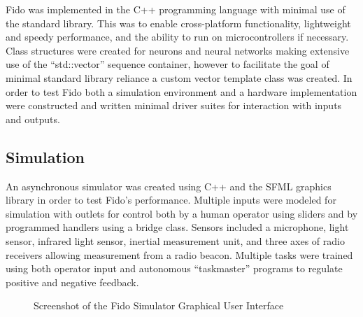 Fido was implemented in the C++ programming language with minimal use of the standard library.  This was to enable cross-platform functionality, lightweight and speedy performance, and the ability to run on microcontrollers if necessary.  Class structures were created for neurons and neural networks making extensive use of the ``std::vector'' sequence container, however to facilitate the goal of minimal standard library reliance a custom vector template class was created.  In order to test Fido both a simulation environment and a hardware implementation were constructed and written minimal driver suites for interaction with inputs and outputs. 

\subsection{Simulation}

An asynchronous simulator was created using C++ and the SFML graphics library in order to test Fido's performance.  Multiple inputs were modeled for simulation with outlets for control both by a human operator using sliders and by programmed handlers using a bridge class.  Sensors included a microphone, light sensor, infrared light sensor, inertial measurement unit, and three axes of radio receivers allowing measurement from a radio beacon.  Multiple tasks were trained using both operator input and autonomous ``taskmaster'' programs to regulate positive and negative feedback.


\begin{figure}
	\centering
	\caption{Screenshot of the Fido Simulator Graphical User Interface}
\end{figure}

